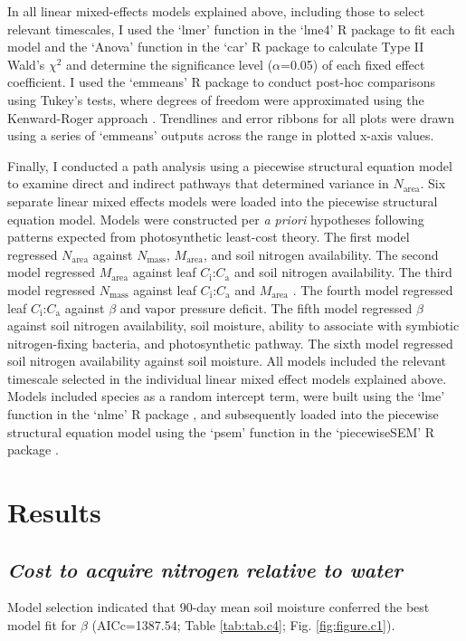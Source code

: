 In all linear mixed-effects models explained above, including those to select relevant timescales, I used the `lmer' function in the `lme4' R package  to fit each model and the `Anova' function in the `car' R package  to calculate Type II Wald's $\chi^2$ and determine the significance level ($\alpha$=0.05) of each fixed effect coefficient. I used the `emmeans' R package  to conduct post-hoc comparisons using Tukey's tests, where degrees of freedom were approximated using the Kenward-Roger approach . Trendlines and error ribbons for all plots were drawn using a series of `emmeans’ outputs across the range in plotted x-axis values.

Finally, I conducted a path analysis using a piecewise structural equation model to examine direct and indirect pathways that determined variance in $N_\mathrm{area}$. Six separate linear mixed effects models were loaded into the piecewise structural equation model. Models were constructed per \textit{a priori} hypotheses following patterns expected from photosynthetic least-cost theory. The first model regressed $N_\mathrm{area}$ against $N_\mathrm{mass}$, $M_\mathrm{area}$, and soil nitrogen availability. The second model regressed $M_\mathrm{area}$ against leaf $C_\mathrm{i}$:$C_\mathrm{a}$ and soil nitrogen availability. The third model regressed $N_\mathrm{mass}$ against leaf $C_\mathrm{i}$:$C_\mathrm{a}$ and $M_\mathrm{area}$ . The fourth model regressed leaf $C_\mathrm{i}$:$C_\mathrm{a}$ against $\beta$ and vapor pressure deficit. The fifth model regressed $\beta$ against soil nitrogen availability, soil moisture, ability to associate with symbiotic nitrogen-fixing bacteria, and photosynthetic pathway. The sixth model regressed soil nitrogen availability against soil moisture. All models included the relevant timescale selected in the individual linear mixed effect models explained above. Models included species as a random intercept term, were built using the `lme’ function in the `nlme’ R package , and subsequently loaded into the piecewise structural equation model using the `psem’ function in the `piecewiseSEM’ R package .
\clearpage

\newpage
\section{Results}
\subsection{\textit{Cost to acquire nitrogen relative to water}}
\noindent Model selection indicated that 90-day mean soil moisture conferred the best model fit for $\beta$ (AICc=1387.54; Table \ref{tab:tab.c4}; Fig. \ref{fig:figure.c1}).


